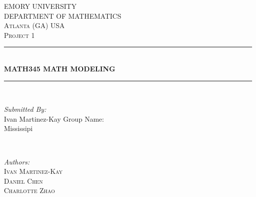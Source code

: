 \documentclass[12pt]{article}
\newcommand{\HRule}{\rule{\linewidth}{0.5mm}}
\begin{document}
\begin{titlepage}

\center %
 

\textsc{\LARGE EMORY UNIVERSITY}\\[0.3cm]
\textsc{\LARGE DEPARTMENT OF MATHEMATICS}\\[0.3cm]
\textsc{\Large Atlanta (GA) USA}\\[0.3cm]
\textsc{\Large Project 1}\\[0.5cm]


\HRule \\[0.4cm]
{\large \bfseries MATH345 MATH MODELING}\\[0.03cm]
\HRule \\[1.5cm]


\begin{minipage}{0.4\textwidth}
\begin{flushleft} \large
\emph{Submitted By:} \\ Ivan Martinez-Kay
Group Name: \\ Mississipi
\end{flushleft}
\end{minipage}
~
\begin{minipage}{0.4\textwidth}
\begin{flushright} 
\small \emph{Authors:}\\[0.3cm]
\textsc{Ivan Martinez-Kay}\\[0.3cm]
\textsc{Daniel Chen}\\[0.3cm]
\textsc{Charlotte Zhao}\\[0.3cm]
\end{flushright}
\end{minipage}\\[1cm]



\end{titlepage}
\end{document}
